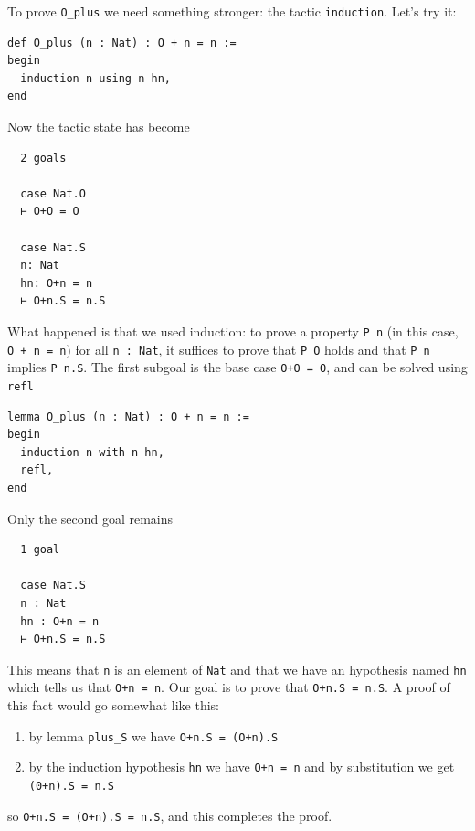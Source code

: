 \documentclass[oneside]{book}
\theoremstyle{definition}
\theoremstyle{remark}
\theoremstyle{plain}
\begin{document}
To prove \lstinline{O_plus} we need something stronger: the tactic \lstinline{induction}.
Let's try it:
\begin{lstlisting}
def O_plus (n : Nat) : O + n = n :=
begin
  induction n using n hn,
end
\end{lstlisting}
Now the tactic state has become
\begin{lstlisting}
  2 goals

  case Nat.O
  ⊢ O+O = O

  case Nat.S
  n: Nat
  hn: O+n = n
  ⊢ O+n.S = n.S
\end{lstlisting}
What happened is that we used induction:
to prove a property \lstinline{P n} (in this case, \lstinline{O + n = n}) for all \lstinline{n : Nat},
it suffices to prove that \lstinline{P O} holds and that \lstinline{P n} implies \lstinline{P n.S}.
The first subgoal is the base case \lstinline{O+O = O}, and can be solved using \lstinline{refl}
\begin{lstlisting}
lemma O_plus (n : Nat) : O + n = n :=
begin
  induction n with n hn,
  refl,
end
\end{lstlisting}
Only the second goal remains
\begin{lstlisting}
  1 goal

  case Nat.S
  n : Nat
  hn : O+n = n
  ⊢ O+n.S = n.S
\end{lstlisting}
This means that \lstinline{n} is an element of \lstinline{Nat}
and that we have an hypothesis named \lstinline{hn} which tells us that \lstinline{O+n = n}.
Our goal is to prove that \lstinline{O+n.S = n.S}.
A proof of this fact would go somewhat like this:
\begin{enumerate}
\item by lemma \lstinline{plus_S} we have \lstinline{O+n.S = (O+n).S}
\item by the induction hypothesis \lstinline{hn} we have \lstinline{O+n = n} and by substitution we get \lstinline{(0+n).S = n.S}
\end{enumerate}
so \lstinline{O+n.S = (O+n).S = n.S}, and this completes the proof.
\end{document}
